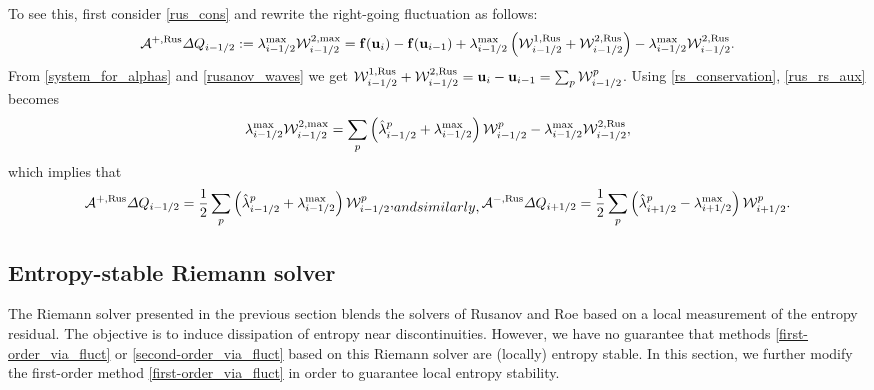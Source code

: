 \documentclass[preprint, 11pt]{article}
\newcommand{\W}{{\mathcal W}}
\newcommand{\A}{{\mathcal A}}
\newcommand{\bff}{{\bf f}}
\newcommand{\bfu}{{\bf u}}
\newcommand{\Rus}{{\rm Rus}}
\begin{document}
To see this, first consider \eqref{rus_cons} and rewrite the right-going fluctuation as follows:
\begin{align}\label{rus_rs_aux}
  \A^{+,\Rus}\Delta Q_{i-1/2}:=\lambda_{i-1/2}^{\max}\W_{i-1/2}^{2,\max}
  = \bff(\bfu_{i})-\bff(\bfu_{i-1}) + \lambda_{i-1/2}^{\max}\left(\W_{i-1/2}^{1,\Rus}+\W_{i-1/2}^{2,\Rus}\right)
  -\lambda_{i-1/2}^{\max}\W_{i-1/2}^{2,\Rus}.
\end{align}
From \eqref{system_for_alphas} and \eqref{rusanov_waves} we get
$\W^{1,\Rus}_{i-1/2}+\W^{2,\Rus}_{i-1/2}=\bfu_i-\bfu_{i-1}=\sum_p\W_{i-1/2}^p$.
Using \eqref{rs_conservation}, \eqref{rus_rs_aux} becomes
\begin{align*}
  \lambda_{i-1/2}^{\max}\W_{i-1/2}^{2,\max}
  = \sum_p \left(\hat \lambda_{i-1/2}^p + \lambda_{i-1/2}^{\max}\right)\W_{i-1/2}^p
  -\lambda_{i-1/2}^{\max}\W_{i-1/2}^{2,\Rus},
\end{align*}
which implies that
\begin{subequations}\label{fluct_rus}
\begin{align}
  \A^{+,\Rus}\Delta Q_{i-1/2}=\frac{1}{2}\sum_p\left(\hat \lambda_{i-1/2}^p + \lambda_{i-1/2}^{\max}\right)\W_{i-1/2}^p,
\end{align}
and similarly,
\begin{align}
  \A^{-,\Rus}\Delta Q_{i+1/2}=\frac{1}{2}\sum_p\left(\hat \lambda_{i+1/2}^p - \lambda_{i+1/2}^{\max}\right)\W_{i+1/2}^p.
\end{align}
\end{subequations}


\subsection{Entropy-stable Riemann solver}\label{sec:entropy_stable}
The Riemann solver presented in the previous section blends the solvers of Rusanov and Roe based on a
local measurement of the entropy residual. The objective is to induce dissipation of entropy
near discontinuities. However, we have no guarantee that methods \eqref{first-order_via_fluct}
or \eqref{second-order_via_fluct} based on this Riemann solver are (locally) entropy stable.
In this section, we further modify the first-order method
\eqref{first-order_via_fluct} in order to guarantee local entropy stability.
\end{document}
